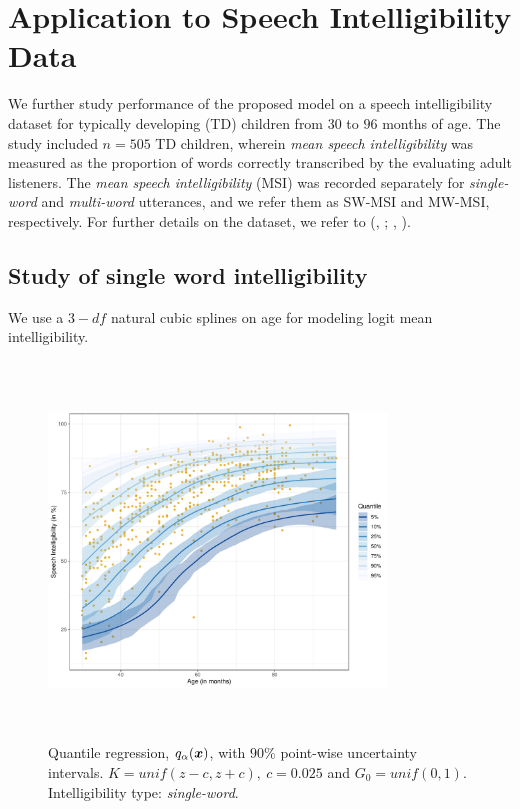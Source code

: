 \documentclass{article}[12pt]
\newcommand{\citeb}[2]{(\href{cite.#1}{\citeauthor{#1}}, \href{cite.#1}{\textcolor{blue} {\citeyear{#1}}}; \href{cite.#2}{\citeauthor{#2}}, \href{cite.#2}{\textcolor{blue} {\citeyear{#2}}})} %
\newcommand{\bx}{\mbox{\boldmath $x$}}
\begin{document}
\section{Application to Speech Intelligibility Data}
\label{sec:ex}
We further study performance of the proposed model on a speech intelligibility dataset for typically developing (TD) children from $30$ to $96$ months of age. The study included $n = 505$ TD children, wherein \textit{mean speech intelligibility} was measured as the proportion of words correctly transcribed by the evaluating adult listeners. The \textit{mean speech intelligibility} (MSI) was recorded separately for \textit{single-word} and \textit{multi-word} utterances, and we refer them as SW-MSI and MW-MSI, respectively. For further details on the dataset, we refer to \citeb{mahr:2020}{hustad:2021}.

\subsection{%
Study of single word intelligibility}
We use a $3-df$ natural cubic splines on age for modeling logit mean intelligibility.
\begin{figure}[H]
    \centering
    \includegraphics[width = 0.8\textwidth, height = 10cm]{plots/quantilesRDS3SingleWord.pdf}
    \caption{Quantile regression, $q_{\alpha}(\bx)$, with $90\%$ point-wise uncertainty intervals. $K = unif(z - c, z + c), \ c = 0.025$ and $G_0 = unif(0, 1)$. Intelligibility type: \textit{single-word}.}
    \label{fig:1}
\end{figure}
\end{document}
